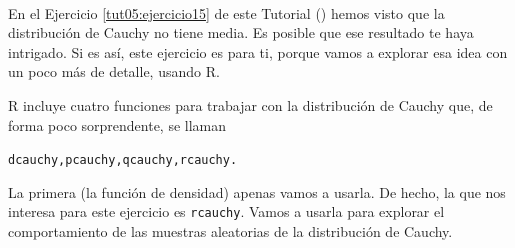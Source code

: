 \documentclass[10pt,a4paper]{article}\usepackage[]{graphicx}\usepackage[]{color}
\begin{document}
\begin{ejercicio}
\label{tut05:ejercicio56}
\quad\\
En el Ejercicio \ref{tut05:ejercicio15} de este Tutorial (\pageref{tut05:ejercicio15}) hemos visto que la distribución de Cauchy no tiene media. Es posible que ese resultado te haya intrigado. Si es así, este ejercicio es para ti, porque vamos a explorar esa idea con un poco más de detalle, usando R.

R incluye cuatro funciones para trabajar con la distribución de Cauchy que, de forma poco sorprendente, se llaman
    \begin{center}
    {\tt    dcauchy,\qquad     pcauchy,\qquad     qcauchy,\qquad     rcauchy.}
    \end{center}
La primera (la función de densidad) apenas vamos a usarla. De hecho, la que nos interesa para este ejercicio es {\tt rcauchy}. Vamos a usarla para explorar el comportamiento de las muestras aleatorias de la distribución de Cauchy.


\end{ejercicio}
\end{document}
